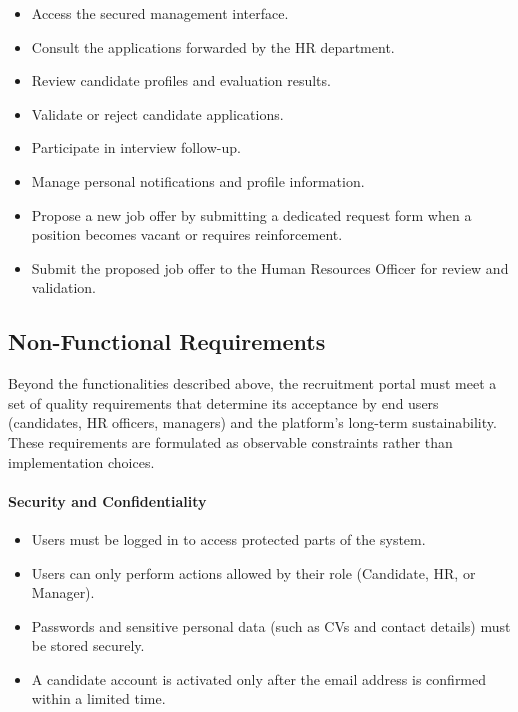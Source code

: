 \begin{itemize}[label={-}]
    \item Access the secured management interface.
    \item Consult the applications forwarded by the HR department.
    \item Review candidate profiles and evaluation results.
    \item Validate or reject candidate applications.
    \item Participate in interview follow-up.
    \item Manage personal notifications and profile information.
    \item Propose a new job offer by submitting a dedicated request form when a position becomes vacant or requires reinforcement.
    \item Submit the proposed job offer to the Human Resources Officer for review and validation.
\end{itemize}

\subsection{Non-Functional Requirements}

Beyond the functionalities described above, the recruitment portal must meet a set of quality requirements that determine its acceptance by end users (candidates, HR officers, managers) and the platform's long-term sustainability. These requirements are formulated as observable constraints rather than implementation choices.

\paragraph*{Security and Confidentiality}
\begin{itemize}[label={-}]
    \item Users must be logged in to access protected parts of the system.
    \item Users can only perform actions allowed by their role (Candidate, HR, or Manager).
    \item Passwords and sensitive personal data (such as CVs and contact details) must be stored securely.
    \item A candidate account is activated only after the email address is confirmed within a limited time.
\end{itemize}

